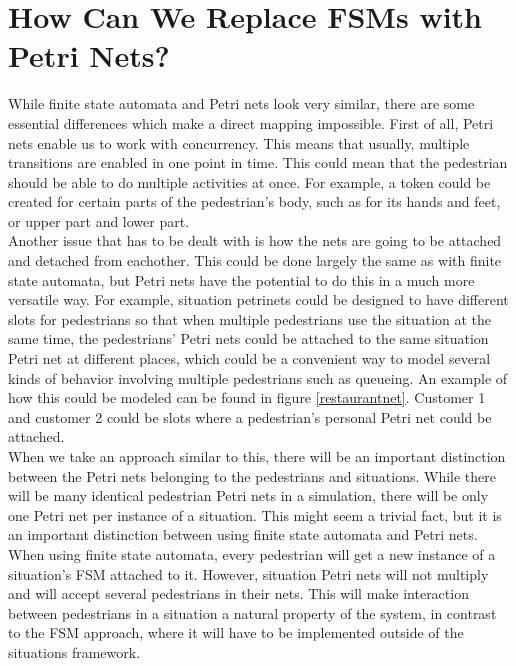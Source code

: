 \documentclass[11pt]{article}
\begin{document}
\section{How Can We Replace FSMs with Petri Nets?}
While finite state automata and Petri nets look very similar, there are some essential differences which make a direct mapping impossible. First of all, Petri nets enable us to work with concurrency. This means that usually, multiple transitions are enabled in one point in time. This could mean that the pedestrian should be able to do multiple activities at once. For example, a token could be created for certain parts of the pedestrian's body, such as for its hands and feet, or upper part and lower part.\\
Another issue that has to be dealt with is how the nets are going to be attached and detached from eachother. This could be done largely the same as with finite state automata, but Petri nets have the potential to do this in a much more versatile way. For example, situation petrinets could be designed to have different slots for pedestrians so that when multiple pedestrians use the situation at the same time, the pedestrians' Petri nets could be attached to the same situation Petri net at different places, which could be a convenient way to model several kinds of behavior involving multiple pedestrians such as queueing. An example of how this could be modeled can be found in figure \ref{restaurantnet}. Customer 1 and customer 2 could be slots where a pedestrian's personal Petri net could be attached. \\
When we take an approach similar to this, there will be an important distinction between the Petri nets belonging to the pedestrians and situations. While there will be many identical pedestrian Petri nets in a simulation, there will be only one Petri net per instance of a situation. This might seem a trivial fact, but it is an important distinction between using finite state automata and Petri nets. When using finite state automata, every pedestrian will get a new instance of a situation's FSM attached to it. However, situation Petri nets will not multiply and will accept several pedestrians in their nets. This will make interaction between pedestrians in a situation a natural property of the system, in contrast to the FSM approach, where it will have to be implemented outside of the situations framework.
\end{document}
